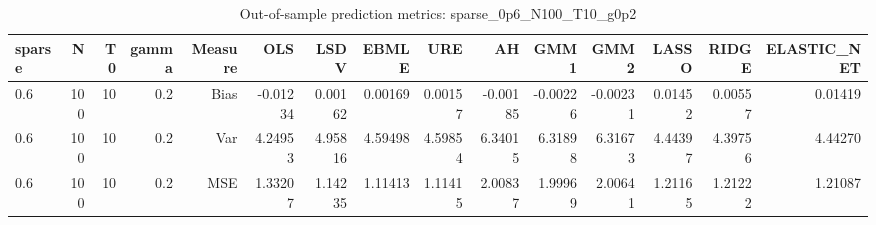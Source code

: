 \begin{table}[!htbp]\centering
\caption{Out-of-sample prediction metrics: sparse_0p6_N100_T10_g0p2}
\label{tab:table3_sparse_0p6_N100_T10_g0p2}
\begin{tabular}{lrrrrrrrrrrrrrr}
\hline
sparse & N & T0 & gamma & Measure & OLS & LSDV & EBMLE & URE & AH & GMM1 & GMM2 & LASSO & RIDGE & ELASTIC_NET \\
\hline
0.6 & 100 & 10 & 0.2 & Bias & -0.01234 & 0.00162 & 0.00169 & 0.00157 & -0.00185 & -0.00226 & -0.00231 & 0.01452 & 0.00557 & 0.01419 \\
0.6 & 100 & 10 & 0.2 & Var & 4.24953 & 4.95816 & 4.59498 & 4.59854 & 6.34015 & 6.31898 & 6.31673 & 4.44397 & 4.39756 & 4.44270 \\
0.6 & 100 & 10 & 0.2 & MSE & 1.33207 & 1.14235 & 1.11413 & 1.11415 & 2.00837 & 1.99969 & 2.00641 & 1.21165 & 1.21222 & 1.21087 \\
\hline
\end{tabular}
\end{table}

